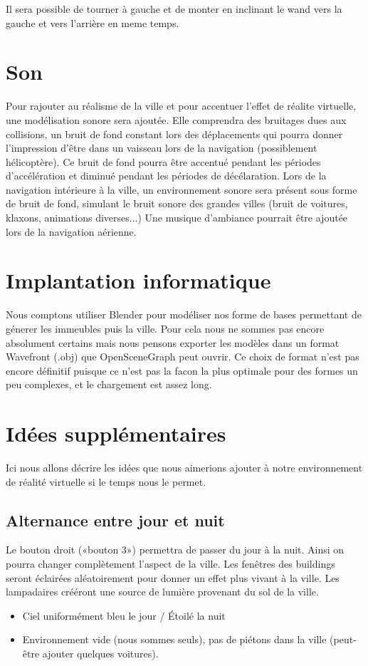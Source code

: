 \documentclass[a4paper,12pt]{article}
\begin{document}
Il sera possible de tourner à gauche et de monter en inclinant le wand vers la gauche et vers l'arrière en meme temps.

 
\section{Son}
Pour rajouter au réalisme de la ville et pour accentuer l'effet de réalite virtuelle, une modélisation sonore sera ajoutée. 
Elle comprendra des bruitages dues aux collisions, un bruit de fond constant lors des déplacements qui pourra donner l'impression d'être dans un vaisseau lors de la navigation (possiblement hélicoptère).
Ce bruit de fond pourra être accentué pendant les périodes d'accélération et diminué pendant les périodes de décélaration.
Lors de la navigation intérieure à la ville, un environnement sonore sera présent sous forme de bruit de fond, simulant le bruit sonore des grandes villes (bruit de voitures, klaxons, animations diverses...)
Une musique d'ambiance pourrait être ajoutée lors de la navigation aérienne.
 
\section{Implantation informatique}
Nous comptons utiliser Blender pour modéliser nos forme de bases permettant de génerer les immeubles puis la ville. Pour cela nous ne sommes pas encore absolument certains mais nous pensons exporter les modèles dans un format Wavefront (.obj) que OpenSceneGraph peut ouvrir. Ce choix de format n'est pas encore définitif puisque ce n'est pas la facon la plus optimale pour des formes un peu complexes, et le chargement est assez long.

 
\section{Idées supplémentaires}
Ici nous allons décrire les idées que nous aimerions ajouter à notre environnement de réalité virtuelle si le temps nous le permet.

\subsection{Alternance entre jour et nuit}
Le bouton droit («bouton 3») permettra de passer du jour à la nuit. Ainsi on pourra changer complètement l'aspect de la ville. Les fenêtres des buildings seront éclairées aléatoirement pour donner un effet plus vivant à la ville. Les lampadaires crééront une source de lumière provenant du sol de la ville.
\begin{itemize}
\item Ciel uniformément bleu le jour / Étoilé la nuit
\item Environnement vide (nous sommes seuls), pas de piétons dans la ville (peut-être ajouter quelques voitures).
\end{itemize}
 
\end{document}
